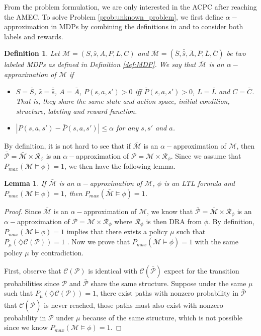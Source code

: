 \documentclass[journal]{IEEEtran}
\newtheorem{lemma}{Lemma}
\newtheorem{definition}{Definition}
\begin{document}
From the problem formulation, we are only interested in the ACPC after reaching the AMEC. To solve Problem \ref{prob:unknown_problem}, we first define $\alpha-$approximation in MDPs by combining the definitions in \cite{brafman2002r} and \cite{Fu-RSS-14} to consider both labels and rewards.
\begin{definition}\label{dfn:alphaMDP}
	Let $\mathcal{M}=(S,\hat{s},A,P,L,C)$ and $\bar{\mathcal{M}}=(\bar{S},\bar{\hat{s}},\bar{A},\bar{P},\bar{L},\bar{C})$ be two labeled MDPs as defined in Definition \ref{def:MDP}. We say that $\bar{\mathcal{M}}$ is an $\alpha-$approximation of $\mathcal{M}$ if
	\begin{itemize}
		\item $S=\bar{S}$, $\hat{s}=\bar{\hat{s}}$, $A=\bar{A}$, $P(s,a,s')>0$ iff $\bar{P}(s,a,s')>0$, $L=\bar{L}$ and $C=\bar{C}$. That is, they share the same state and action space, initial condition, structure, labeling and reward function.
		\item $|P(s,a,s')-\bar{P}(s,a,s')|\leq\alpha$ for any $s,s'$ and $a$.
	\end{itemize}
\end{definition}
By definition, it is not hard to see that if $\bar{\mathcal{M}}$ is an $\alpha-$approximation of $\mathcal{M}$, then $\bar{\mathcal{P}}=\bar{\mathcal{M}}\times\mathcal{R}_{\phi}$ is an $\alpha-$approximation of $\mathcal{P}=\mathcal{M}\times\mathcal{R}_{\phi}$. Since we assume that $P_{max}(\mathcal{M}\models\phi)=1$, we then have the following lemma. 
\begin{lemma}
	If $\bar{\mathcal{M}}$ is an $\alpha-$approximation of $\mathcal{M}$, $\phi$ is an LTL formula and  $P_{max}(\mathcal{M}\models\phi)=1$, then $P_{max}(\bar{\mathcal{M}}\models\phi)=1$.
\end{lemma}
\begin{proof}
	Since $\bar{\mathcal{M}}$ is an $\alpha-$approximation of $\mathcal{M}$, we know that $\bar{\mathcal{P}}=\bar{\mathcal{M}}\times\mathcal{R}_{\phi}$ is an $\alpha-$approximation of $\mathcal{P}=\mathcal{M}\times\mathcal{R}_{\phi}$ where $\mathcal{R}_{\phi}$ is then DRA from $\phi$. By definition, $P_{max}(\mathcal{M}\models\phi)=1$ implies that there exists a policy $\mu$ such that $P_\mu(\diamondsuit\mathcal{C}(\mathcal{P}))=1$ . Now we prove that $ P_{max}(\bar{\mathcal{M}}\models\phi)=1$ with the same policy $\mu$ by contradiction. 
	
	First, observe that $\mathcal{C}(\mathcal{P})$ is identical with $\mathcal{C}(\bar{\mathcal{P}})$ expect for the transition probabilities since $\mathcal{P}$ and $\bar{\mathcal{P}}$ share the same structure. Suppose under the same $\mu$ such that $P_\mu(\diamondsuit\mathcal{C}(\mathcal{P}))=1$, there exist paths with nonzero probability in $\bar{\mathcal{P}}$ that $\mathcal{C}(\bar{\mathcal{P}})$ is never reached, those paths must also exist with nonzero probability in $\mathcal{P}$ under $\mu$ because of the same structure, which is not possible since we know $ P_{max}(\mathcal{M}\models\phi)=1$.
\end{proof}
\end{document}
